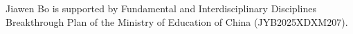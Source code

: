 \documentclass[11pt]{article}
\newtheorem{problem}[theorem]{Problem}
\theoremstyle{remark}
\DeclareMathOperator{\diam}{diam}
\begin{document}
  Jiawen Bo is supported by Fundamental and Interdisciplinary Disciplines Breakthrough Plan of the Ministry of Education of China (JYB2025XDXM207).





 
\end{document}
